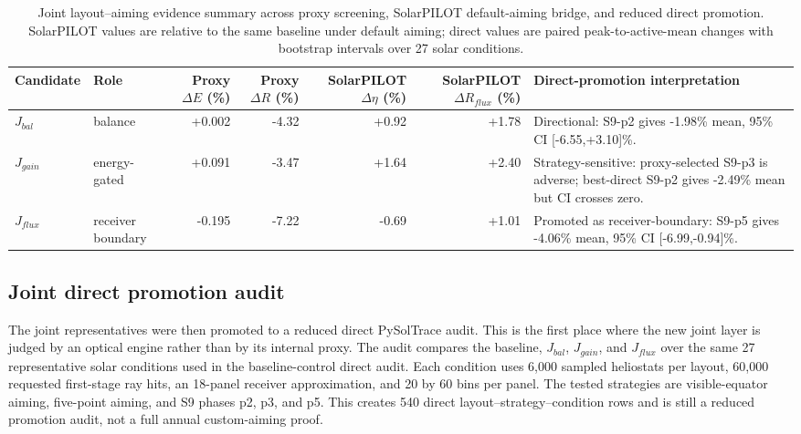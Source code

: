 \documentclass[final,3p,times]{elsarticle}
\begin{document}
\begin{table}[t]
\centering
\caption{Joint layout--aiming evidence summary across proxy screening, SolarPILOT default-aiming bridge, and reduced direct promotion. SolarPILOT values are relative to the same baseline under default aiming; direct values are paired peak-to-active-mean changes with bootstrap intervals over 27 solar conditions.}
\label{tab:joint-system-evidence}
\scriptsize
\begin{tabular*}{\textwidth}{@{\extracolsep{\fill}}llrrrrp{}@{}}
\toprule
Candidate & Role & Proxy $\Delta E$ (\%) & Proxy $\Delta R$ (\%) & SolarPILOT $\Delta\eta$ (\%) & SolarPILOT $\Delta R_{flux}$ (\%) & Direct-promotion interpretation \\
\midrule
$J_{bal}$ & balance & +0.002 & -4.32 & +0.92 & +1.78 & Directional: S9-p2 gives -1.98\% mean, 95\% CI [-6.55,+3.10]\%. \\
$J_{gain}$ & energy-gated & +0.091 & -3.47 & +1.64 & +2.40 & Strategy-sensitive: proxy-selected S9-p3 is adverse; best-direct S9-p2 gives -2.49\% mean but CI crosses zero. \\
$J_{flux}$ & receiver boundary & -0.195 & -7.22 & -0.69 & +1.01 & Promoted as receiver-boundary: S9-p5 gives -4.06\% mean, 95\% CI [-6.99,-0.94]\%. \\
\bottomrule
\end{tabular*}
\end{table}

\subsection{Joint direct promotion audit}
The joint representatives were then promoted to a reduced direct PySolTrace audit. This is the first place where the new joint layer is judged by an optical engine rather than by its internal proxy. The audit compares the baseline, $J_{bal}$, $J_{gain}$, and $J_{flux}$ over the same 27 representative solar conditions used in the baseline-control direct audit. Each condition uses 6,000 sampled heliostats per layout, 60,000 requested first-stage ray hits, an 18-panel receiver approximation, and 20 by 60 bins per panel. The tested strategies are visible-equator aiming, five-point aiming, and S9 phases p2, p3, and p5. This creates 540 direct layout--strategy--condition rows and is still a reduced promotion audit, not a full annual custom-aiming proof.
\end{document}
